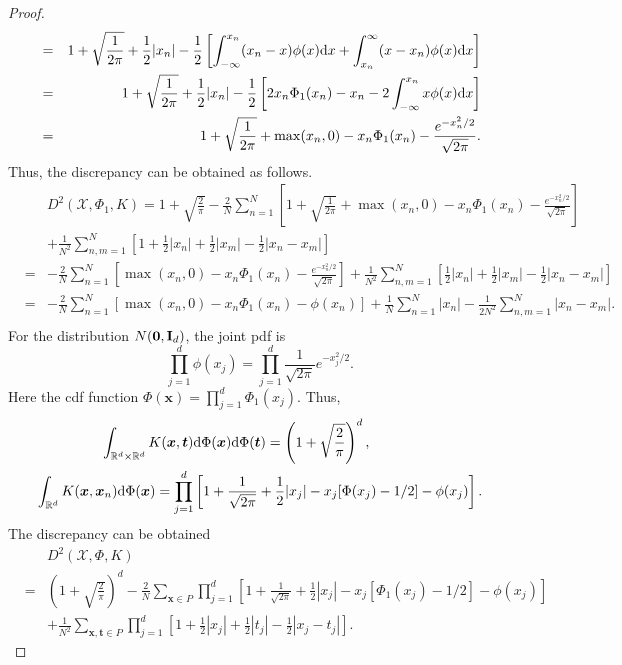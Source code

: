 \documentclass[graybox]{svmult}
\newcommand{\reals}{\mathbb{R}}
\newcommand{\vx}{\boldsymbol{x}}
\newcommand{\vt}{\boldsymbol{t}}
\newcommand{\dif}{{\rm d}}
\newcommand{\Xdes}{\mathcal{X}}
\begin{document}
\begin{proof}
\begin{eqnarray*}
&=& 1+\sqrt{\frac{1}{2\pi}}+\frac{1}{2}|x_n|-\frac{1}{2}\left[\int_{-\infty}^{x_n}(x_n-x)\phi(x)\dif x+\int_{x_n}^{\infty} (x-x_n)\phi(x)\dif x\right]\\
&=& 1+\sqrt{\frac{1}{2\pi}}+\frac{1}{2}|x_n|-\frac{1}{2}\left[2x_n\Phi_1(x_n)-x_n-2\int_{-\infty}^{x_n}x\phi(x)\dif x\right]\\
&=& 1+\sqrt{\frac{1}{2\pi}}+\max(x_n,0)-x_n\Phi_1(x_n)-\frac{ e^{-x_n^2/2}}{\sqrt{2\pi}}. 
\end{eqnarray*}
Thus, the discrepancy can be obtained as follows. 
\begin{eqnarray*}
&& D^2(\Xdes,\Phi_1,K)=1+\sqrt{\frac{2}{\pi}}-\frac{2}{N}\sum_{n=1}^N \left[1+\sqrt{\frac{1}{2\pi}}+\max(x_n,0)-x_n\Phi_1(x_n)-\frac{ e^{-x_n^2/2}}{\sqrt{2\pi}}\right]\\
&&+\frac{1}{N^2}\sum_{n,m=1}^N \left[1+\frac{1}{2}|x_n|+\frac{1}{2}|x_m|-\frac{1}{2}|x_n-x_m|\right]\\
&= &-\frac{2}{N}\sum_{n=1}^N \left[\max(x_n,0)-x_n\Phi_1(x_n)-\frac{ e^{-x_n^2/2}}{\sqrt{2\pi}}\right]+\frac{1}{N^2}\sum_{n,m=1}^N \left[\frac{1}{2}|x_n|+\frac{1}{2}|x_m|-\frac{1}{2}|x_n-x_m|\right]\\
&=& -\frac{2}{N}\sum_{n=1}^N \left[\max(x_n,0)-x_n\Phi_1(x_n)-\phi(x_n)\right]+\frac{1}{N}\sum_{n=1}^N|x_n|-\frac{1}{2N^2}\sum_{n,m=1}^N|x_n-x_m|.\\
\end{eqnarray*}
For the distribution $N({\bf 0}, {\bf I}_d)$, the joint pdf is $$\prod\limits_{j=1}^d\phi(x_j) = \prod\limits_{j=1}^d \frac{1}{\sqrt{2\pi}}e^{-x_j^2/2}.$$
Here the cdf function $\Phi(\vx)=\prod_{j=1}^d \Phi_1(x_j)$. Thus, 
\begin{align*}
\int_{\reals^d\times \reals^d} K(\vx,\vt)&\dif\Phi(\vx)\dif\Phi(\vt) = \left(1+\sqrt{\frac{2}{\pi}}\right)^d, \\
\int_{\reals^d}K(\vx,\vx_n)\dif\Phi(\vx) = \prod\limits_{j=1}^d&\left[ 1+\frac{1}{\sqrt{2\pi}}+\frac{1}{2}|x_j|-x_j[\Phi(x_j)-1/2]-\phi(x_j)\right].
\end{align*}
The discrepancy can be obtained
\begin{eqnarray*}
&&D^2(\Xdes, \Phi, K)\\
&=& \left(1+\sqrt{\frac{2}{\pi}}\right)^d - \frac{2}{N}\sum\limits_{\vx\in P} \prod\limits_{j=1}^d\left[ 1+\frac{1}{\sqrt{2\pi}}+\frac{1}{2}|x_j|-x_j[\Phi_1(x_j)-1/2]-\phi(x_j)\right]\\
&&+\frac{1}{N^2}\sum_{\vx,\vt\in P}\prod_{j=1}^d \left[1+\frac{1}{2}|x_j|+\frac{1}{2}|t_j|-\frac{1}{2}|x_j-t_j|\right]. 
\end{eqnarray*}       
\end{proof}


%

\end{document}
